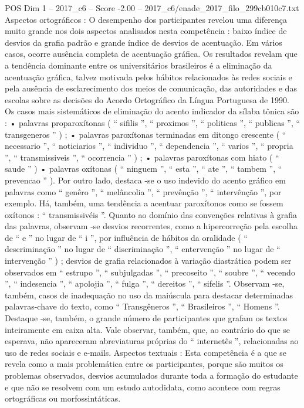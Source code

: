 \begin{textsample}{POS Dim 1 – 2017\_c6 – Score -2.00 – 2017\_c6/enade\_2017\_filo\_299cb010c7.txt}
Aspectos ortográficos : O desempenho dos participantes revelou uma diferença muito grande nos dois aspectos analisados nesta competência : baixo índice de desvios da grafia padrão e grande índice de desvios de acentuação.
Em vários casos, ocorre ausência completa de acentuação gráfica.
Os resultados revelam que a tendência dominante entre os universitários brasileiros é a eliminação da acentuação gráfica, talvez motivada pelos hábitos relacionados às redes sociais e pela ausência de esclarecimento dos meios de comunicação, das autoridades e das escolas sobre as decisões do Acordo Ortográfico da Língua Portuguesa de 1990.
Os casos mais sistemáticos de eliminação do acento indicador da sílaba tônica são : • palavras proparoxítonas ( “ sifilis ”, “ proximos ”, “ politicas ”, “ publicas ”, “ transgeneros ” ) ; • palavras paroxítonas terminadas em ditongo crescente ( “ necessario ”, “ noticiarios ”, “ individuo ”, “ dependencia ”, “ varios ”, “ propria ”, “ transmissiveis ”, “ ocorrencia ” ) ; • palavras paroxítonas com hiato ( “ saude ” ) • palavras oxítonas ( “ ninguem ”, “ esta ”, “ ate ”, “ tambem ”, “ prevencao ” ).
Por outro lado, destaca -se o uso indevido do acento gráfico em palavras como “ genêro ”, “ melâncolia ”, “ prevênção ”, “ intervênção ”, por exemplo.
Há, também, uma tendência a acentuar paroxítonos como se fossem oxítonos : “ transmissivéis ”.
Quanto ao domínio das convenções relativas à grafia das palavras, observam -se desvios recorrentes, como a hipercorreção pela escolha de “ e ” no lugar de “ i ”, por influência de hábitos da oralidade ( “ descriminação ” no lugar de “ discriminação ”, “ entervenção ” no lugar de “ intervenção ” ) ; desvios de grafia relacionados à variação diastrática podem ser observados em “ estrupo ”, “ subjulgadas ”, “ precoseito ”, “ soubre ”, “ vecendo ”, “ indesencia ”, “ apolojia ”, “ fulga ”, “ dereitos ”, “ sifelis ”.
Observam -se, também, casos de inadequação no uso da maiúscula para destacar determinadas palavras-chave do texto, como “ Transgêneros ”, “ Brasileiros ”, “ Homens ”.
Destaque -se, também, o grande número de participantes que grafam os textos inteiramente em caixa alta.
Vale observar, também, que, ao contrário do que se esperava, não apareceram abreviaturas próprias do “ internetês ”, relacionadas ao uso de redes sociais e e-mails.
Aspectos textuais : Esta competência é a que se revela como a mais problemática entre os participantes, porque são muitos os problemas observados, desvios acumulados durante toda a formação do estudante e que não se resolvem com um estudo autodidata, como acontece com regras ortográficas ou morfossintáticas.

\end{textsample}
